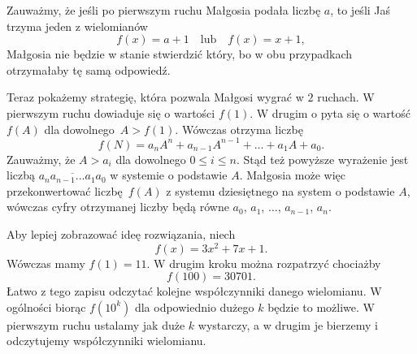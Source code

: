 \noindent
Zauważmy, że jeśli po pierwszym ruchu Małgosia podała liczbę $a$, to jeśli Jaś trzyma jeden z wielomianów
\[
	f(x) = a + 1 \quad \text{lub} \quad f(x) = x + 1,
\]
Małgosia nie będzie w stanie stwierdzić który, bo w obu przypadkach otrzymałaby tę samą odpowiedź.

\vspace{10px}
\noindent
Teraz pokażemy strategię, która pozwala Małgosi wygrać w $2$ ruchach. W pierwszym ruchu dowiaduje się o wartości $f(1)$. W drugim o pyta się o wartość $f(A)$ dla dowolnego~${A > f(1)}$. Wówczas otrzyma liczbę
\[
	f(N) = a_nA^n + a_{n-1}A^{n-1} + \dots + a_1A + a_0.
\] 
Zauważmy, że $A > a_i$ dla dowolnego $0 \leqslant i \leqslant n$. Stąd też powyższe wyrażenie jest liczbą $\overline{a_na_{n-1}...a_1a_0} $ w systemie o podstawie $A$. Małgosia może więc przekonwertować liczbę~$f(A)$ z systemu dziesiętnego na system o podstawie $A$, wówczas cyfry otrzymanej liczby będą równe $a_0$, $a_1$, $\dots$, $a_{n-1}$, $a_n$.

\vspace{10px}
\begin{remark}
	Aby lepiej zobrazować ideę rozwiązania, niech
	\[
		f(x) = 3x^2 + 7x + 1.
	\]
	Wówczas mamy $f(1) = 11$. W drugim kroku można rozpatrzyć chociażby
	\[
		f(100) = 30701.
	\]
	Łatwo z tego zapisu odczytać kolejne współczynniki danego wielomianu. W ogólności biorąc $f(10^k)$ dla odpowiednio dużego $k$ będzie to możliwe. W pierwszym ruchu ustalamy jak duże $k$ wystarczy, a w drugim je bierzemy i odczytujemy współczynniki wielomianu.
\end{remark}
